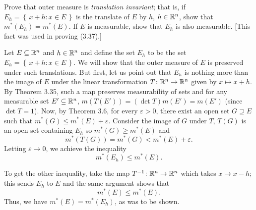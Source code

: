 \begin{problem}
  Prove that outer measure is \emph{translation invariant}; that is, if
  $E_h=\left\{\,x+h:x\in E\,\right\}$ is the translate of $E$ by $h$,
  $h\in\mathbb{R}^n$, show that $m^*(E_h)=m^*(E)$. If $E$ is measurable, show
  that $E_h$ is also measurable. [This fact was used in proving (3.37).]
\end{problem}
\begin{solution}
  Let $E\subseteq\mathbb{R}^n$ and $h\in\mathbb{R}^n$ and define the set $E_h$ to be the
  set $E_h=\left\{\,x+h:x\in E\,\right\}$. We will show that the outer
  measure of $E$ is preserved under such translations. But first, let us
  point out that $E_h$ is nothing more than the image of $E$ under the
  linear transformation $T\colon\mathbb{R}^n\to\mathbb{R}^n$ given by $x\mapsto
  x+h$. By Theorem 3.35, such a map preserves measurability of sets and for
  any measurable set $E'\subseteq\mathbb{R}^n$, $m(T(E'))=(\det T)m(E')=m(E')$
  (since $\det T=1$). Now, by Theorem 3.6, for every $\varepsilon>0$, there
  exist an open set $G\supseteq E$ such that $m^*(G)\leq
  m^*(E)+\varepsilon$. Consider the image of $G$ under $T$, $T(G)$ is an
  open set containing $E_h$ so $m^*(G)\geq m^*(E)$ and
  \[
    m^*(T(G))=m^*(G)<m^*(E)+\varepsilon.
  \]
  Letting $\varepsilon\to 0$, we achieve the inequality
  \[
    m^*(E_h)\leq m^*(E).
  \]

  To get the other inequality, take the map $T^{-1}\colon\mathbb{R}^n\to\mathbb{R}^n$
  which takes $x\mapsto x-h$; this sends $E_h$ to $E$ and the same argument
  shows that
  \[
    m^*(E)\leq m^*(E).
  \]
  Thus, we have $m^*(E)=m^*(E_h)$, as was to be shown.
\end{solution}

